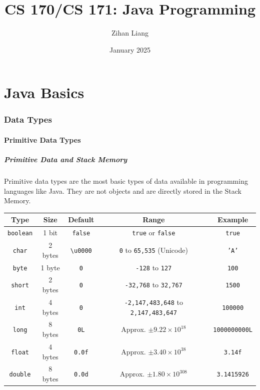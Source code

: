 \documentclass[letterpaper,12pt]{article}
\title{CS 170/CS 171: Java Programming}
\author{Zihan Liang}
\date{January 2025}
\begin{document}
\maketitle

\part{Java Basics}

\section{Data Types}
\subsection{Primitive Data Types}
\subsubsection{Primitive Data and Stack Memory}
Primitive data types are the most basic types of data available in programming languages like Java. They are not objects and are directly stored in the Stack Memory.\\
\begin{table}[h!]
    \centering
    \begin{tabular}{|c|c|c|c|c|}
        \hline
        \textbf{Type} & \textbf{Size} & \textbf{Default} & \textbf{Range} & \textbf{Example} \\ \hline
        \texttt{boolean} & 1 bit & \texttt{false} & \texttt{true} or \texttt{false} & \texttt{true} \\ \hline
        \texttt{char} & 2 bytes & \texttt{\textbackslash u0000} & \texttt{0} to \texttt{65,535} (Unicode) & \texttt{'A'} \\ \hline
        \texttt{byte} & 1 byte & \texttt{0} & \texttt{-128} to \texttt{127} & \texttt{100} \\ \hline
        \texttt{short} & 2 bytes & \texttt{0} & \texttt{-32,768} to \texttt{32,767} & \texttt{1500} \\ \hline
        \texttt{int} & 4 bytes & \texttt{0} & \texttt{-2,147,483,648} to \texttt{2,147,483,647} & \texttt{100000} \\ \hline
        \texttt{long} & 8 bytes & \texttt{0L} & Approx. \(\pm 9.22 \times 10^{18}\) & \texttt{1000000000L} \\ \hline
        \texttt{float} & 4 bytes & \texttt{0.0f} & Approx. \(\pm 3.40 \times 10^{38}\) & \texttt{3.14f} \\ \hline
        \texttt{double} & 8 bytes & \texttt{0.0d} & Approx. \(\pm 1.80 \times 10^{308}\) & \texttt{3.1415926} \\ \hline
    \end{tabular}
\label{tab:primitive-types}
\end{table}
\end{document}
